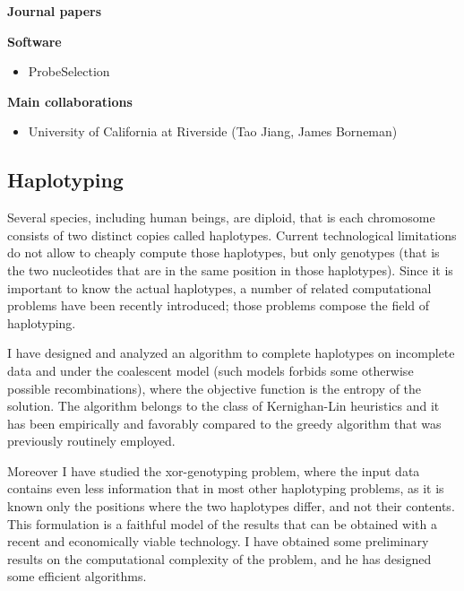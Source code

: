\documentclass[11pt,a4paper,roman]{moderncv}
\begin{document}
\textbf{Journal  papers}

\cite{DBLP:journals/bmcbi/RueggerVJB11}
\cite{valinskyAnalysisBacterialCommunity2002}
\cite{valinskyOligonucleotideFingerprintingRRNA2002}
\cite{bornemanProbeSelectionAlgorithms2001}

\textbf{Software}

\begin{itemize}
	\item
	      ProbeSelection
\end{itemize}


\textbf{Main collaborations}

\begin{itemize}
	\item
	      University of California at Riverside (Tao Jiang, James Borneman)
\end{itemize}

\subsection{Haplotyping}\label{haplotyping}

Several species, including human beings, are diploid, that is each
chromosome consists of two distinct copies called haplotypes. Current
technological limitations do not allow to cheaply compute those
haplotypes, but only genotypes (that is the two nucleotides that are in
the same position in those haplotypes). Since it is important to know
the actual haplotypes, a number of related computational problems have
been recently introduced; those problems compose the field of
haplotyping.

I have designed and analyzed an algorithm to complete haplotypes on
incomplete data and under the coalescent model (such models forbids some
otherwise possible recombinations), where the objective function is the
entropy of the solution. The algorithm belongs to the class of
Kernighan-Lin heuristics and it has been empirically and favorably
compared to the greedy algorithm that was previously routinely employed.

Moreover I have studied the xor-genotyping problem, where the input data
contains even less information that in most other haplotyping problems,
as it is known only the positions where the two haplotypes differ, and
not their contents. This formulation is a faithful model of the results
that can be obtained with a recent and economically viable technology.
I have obtained some preliminary results on the computational complexity
of the problem, and he has designed some efficient algorithms.
\end{document}
